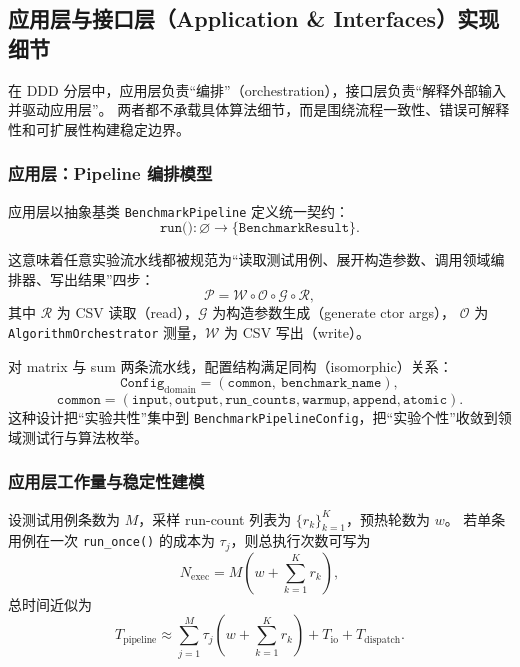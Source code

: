 \subsection{应用层与接口层（Application \& Interfaces）实现细节}

在 DDD 分层中，应用层负责“编排”（orchestration），接口层负责“解释外部输入并驱动应用层”。
两者都不承载具体算法细节，而是围绕流程一致性、错误可解释性和可扩展性构建稳定边界。

\subsubsection{应用层：Pipeline 编排模型}

应用层以抽象基类 \texttt{BenchmarkPipeline} 定义统一契约：
\begin{equation}
\texttt{run()} : \varnothing \rightarrow \{\texttt{BenchmarkResult}\}.
\end{equation}

这意味着任意实验流水线都被规范为“读取测试用例、展开构造参数、调用领域编排器、写出结果”四步：
\begin{equation}
\mathcal{P}=\mathcal{W}\circ\mathcal{O}\circ\mathcal{G}\circ\mathcal{R},
\end{equation}
其中 \(\mathcal{R}\) 为 CSV 读取（read），\(\mathcal{G}\) 为构造参数生成（generate ctor args），
\(\mathcal{O}\) 为 \texttt{AlgorithmOrchestrator} 测量，\(\mathcal{W}\) 为 CSV 写出（write）。

对 matrix 与 sum 两条流水线，配置结构满足同构（isomorphic）关系：
\begin{equation}
\texttt{Config}_{\text{domain}} = (\texttt{common},\ \texttt{benchmark\_name}),
\end{equation}
\begin{equation}
\texttt{common}=(\texttt{input},\texttt{output},\texttt{run\_counts},\texttt{warmup},\texttt{append},\texttt{atomic}).
\end{equation}
这种设计把“实验共性”集中到 \texttt{BenchmarkPipelineConfig}，把“实验个性”收敛到领域测试行与算法枚举。

\subsubsection{应用层工作量与稳定性建模}

设测试用例条数为 \(M\)，采样 run-count 列表为 \(\{r_k\}_{k=1}^{K}\)，预热轮数为 \(w\)。
若单条用例在一次 \texttt{run\_once()} 的成本为 \(\tau_j\)，则总执行次数可写为
\begin{equation}
N_{\text{exec}} = M\left(w + \sum_{k=1}^{K} r_k\right),
\end{equation}
总时间近似为
\begin{equation}
T_{\text{pipeline}} \approx \sum_{j=1}^{M}\tau_j\left(w + \sum_{k=1}^{K} r_k\right) + T_{\text{io}} + T_{\text{dispatch}}.
\end{equation}

